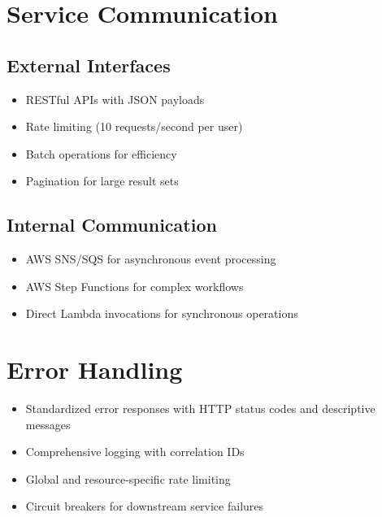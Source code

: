 \documentclass[a4paper, 11pt]{scrreprt}
\begin{document}
\section{Service Communication}

\subsection{External Interfaces}
\begin{itemize}
    \item RESTful APIs with JSON payloads
    \item Rate limiting (10 requests/second per user)
    \item Batch operations for efficiency
    \item Pagination for large result sets
\end{itemize}

\subsection{Internal Communication}
\begin{itemize}
    \item AWS SNS/SQS for asynchronous event processing
    \item AWS Step Functions for complex workflows
    \item Direct Lambda invocations for synchronous operations
\end{itemize}

\section{Error Handling}
\begin{itemize}
    \item Standardized error responses with HTTP status codes and descriptive messages
    \item Comprehensive logging with correlation IDs
    \item Global and resource-specific rate limiting
    \item Circuit breakers for downstream service failures
\end{itemize}
\end{document}
